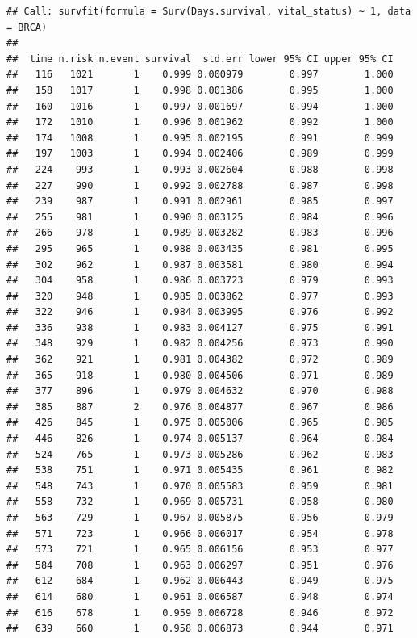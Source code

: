 \documentclass[]{article}
\numberwithin{figure}{section}
\numberwithin{table}{section}
\theoremstyle{definition}
\theoremstyle{definition}
\theoremstyle{definition}
\theoremstyle{remark}
\begin{document}
\begin{verbatim}
## Call: survfit(formula = Surv(Days.survival, vital_status) ~ 1, data = BRCA)
## 
##  time n.risk n.event survival  std.err lower 95% CI upper 95% CI
##   116   1021       1    0.999 0.000979        0.997        1.000
##   158   1017       1    0.998 0.001386        0.995        1.000
##   160   1016       1    0.997 0.001697        0.994        1.000
##   172   1010       1    0.996 0.001962        0.992        1.000
##   174   1008       1    0.995 0.002195        0.991        0.999
##   197   1003       1    0.994 0.002406        0.989        0.999
##   224    993       1    0.993 0.002604        0.988        0.998
##   227    990       1    0.992 0.002788        0.987        0.998
##   239    987       1    0.991 0.002961        0.985        0.997
##   255    981       1    0.990 0.003125        0.984        0.996
##   266    978       1    0.989 0.003282        0.983        0.996
##   295    965       1    0.988 0.003435        0.981        0.995
##   302    962       1    0.987 0.003581        0.980        0.994
##   304    958       1    0.986 0.003723        0.979        0.993
##   320    948       1    0.985 0.003862        0.977        0.993
##   322    946       1    0.984 0.003995        0.976        0.992
##   336    938       1    0.983 0.004127        0.975        0.991
##   348    929       1    0.982 0.004256        0.973        0.990
##   362    921       1    0.981 0.004382        0.972        0.989
##   365    918       1    0.980 0.004506        0.971        0.989
##   377    896       1    0.979 0.004632        0.970        0.988
##   385    887       2    0.976 0.004877        0.967        0.986
##   426    845       1    0.975 0.005006        0.965        0.985
##   446    826       1    0.974 0.005137        0.964        0.984
##   524    765       1    0.973 0.005286        0.962        0.983
##   538    751       1    0.971 0.005435        0.961        0.982
##   548    743       1    0.970 0.005583        0.959        0.981
##   558    732       1    0.969 0.005731        0.958        0.980
##   563    729       1    0.967 0.005875        0.956        0.979
##   571    723       1    0.966 0.006017        0.954        0.978
##   573    721       1    0.965 0.006156        0.953        0.977
##   584    708       1    0.963 0.006297        0.951        0.976
##   612    684       1    0.962 0.006443        0.949        0.975
##   614    680       1    0.961 0.006587        0.948        0.974
##   616    678       1    0.959 0.006728        0.946        0.972
##   639    660       1    0.958 0.006873        0.944        0.971

\end{verbatim}
\end{document}
